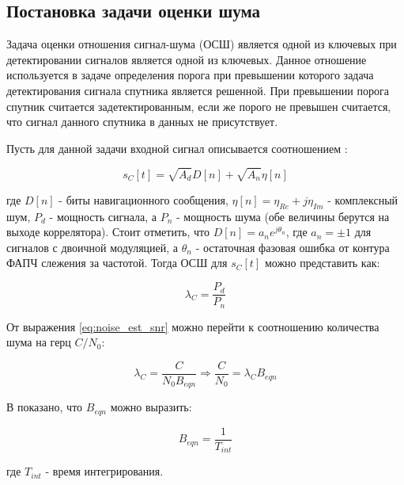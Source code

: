 \subsection{Постановка задачи оценки шума}

Задача оценки отношения сигнал-шума (ОСШ) является одной из ключевых при детектировании сигналов
является одной из ключевых. Данное отношение используется в задаче определения порога при превышении
которого задача детектирования сигнала спутника является решенной. При превышении порога спутник
считается задетектированным, если же порого не превышен считается, что сигнал данного спутника
в данных не присутствует.

Пусть для данной задачи входной сигнал описывается соотношением \cite{presti_ieee}:
\begin{center}
\begin{equation}
	\label{eq:noise_est_signal}
	s_C[t]=\sqrt{A_d}D[n] + \sqrt{A_n}\eta[n]
\end{equation}
\end{center}
где $D[n]$ - биты навигационного сообщения, $\eta[n]=\eta_{Re} + j\eta_{Im}$ - комплексный шум,
$P_d$ - мощность сигнала, а $P_n$ - мощность шума (обе величины берутся на выходе коррелятора).
Стоит отметить, что $D[n]=a_{n}e^{j\theta_n}$, где $a_n=\pm{1}$ для сигналов с двоичной модуляцией, а
$\theta_n$ - остаточная фазовая ошибка от контура ФАПЧ слежения за частотой.
Тогда ОСШ для $s_C[t]$ можно представить как:
\begin{center}
\begin{equation}
	\label{eq:noise_est_snr}
	\lambda_C=\frac{P_d}{P_n}
\end{equation}
\end{center}
От выражения \ref{eq:noise_est_snr} можно перейти к соотношению количества шума на герц $C/N_0$:
\begin{center}
\begin{equation}
	\label{eq:noise_est_cn}
	\lambda_C=\frac{C}{N_{0}B_{eqn}}\Rightarrow\frac{C}{N_0}=\lambda_{C}B_{eqn}
\end{equation}
\end{center}
В \cite{presti_ieee} показано, что $B_{eqn}$ можно выразить:
\begin{center}
\begin{equation}
	\label{eq:noise_est_beqn}
	B_{eqn}=\frac{1}{T_{int}}
\end{equation}
\end{center}
где ${T_{int}}$ - время интегрирования.


\newpage
